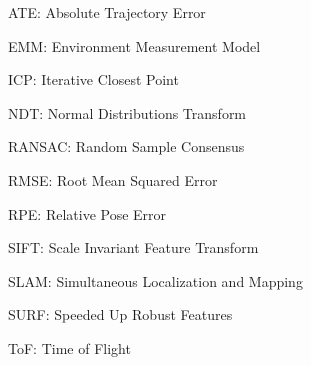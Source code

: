 \begin{description}
\item ATE: Absolute Trajectory Error
\item EMM: Environment Measurement Model
\item ICP: Iterative Closest Point 
\item NDT: Normal Distributions Transform
\item RANSAC: Random Sample Consensus
\item RMSE: Root Mean Squared Error
\item RPE: Relative Pose Error
\item SIFT: Scale Invariant Feature Transform
\item SLAM: Simultaneous Localization and Mapping
\item SURF: Speeded Up Robust Features
\item ToF: Time of Flight
\end{description}
\vspace{\fill}\LaTeXe
